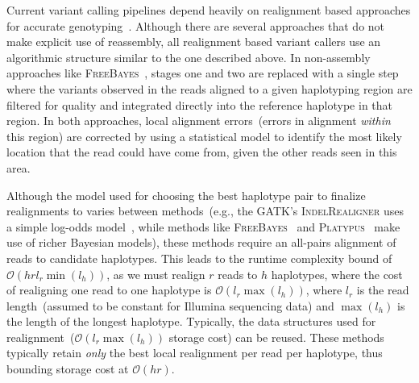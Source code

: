 \documentclass{bioinfo}
\begin{document}
Current variant calling pipelines depend heavily on realignment based approaches for accurate
genotyping~\citep{li14}. Although there are several approaches that do not make explicit use of reassembly,
all realignment based variant callers use an algorithmic structure similar to the one described
above. In non-assembly approaches like \textsc{FreeBayes}~\citep{garrison12}, stages
one and two are replaced with a single step where the variants observed in the reads aligned to a given
haplotyping region are filtered for quality and integrated directly into the reference haplotype in that region.
In both approaches, local alignment errors~(errors in alignment \emph{within} this region) are corrected
by using a statistical model to identify the most likely location that the read could have come from, given
the other reads seen in this area.

Although the model used for choosing the best haplotype pair to finalize realignments to varies between
methods~(e.g., the GATK's \textsc{IndelRealigner} uses a simple log-odds model~\citep{depristo11}, while
methods like \textsc{FreeBayes}~\citep{garrison12} and \textsc{Platypus}~\citep{rimmer14} make use of richer
Bayesian models), these methods require an all-pairs alignment of reads to candidate
haplotypes. This leads to the runtime complexity bound of $\mathcal{O}(h r l_r \min(l_h))$,
as we must realign $r$ reads to $h$ haplotypes, where the cost of realigning
one read to one haplotype is $\mathcal{O}(l_r \max(l_h))$, where $l_r$ is the read length~(assumed to be
constant for Illumina sequencing data) and $\max(l_h)$ is the length of the longest haplotype. Typically,
the data structures used for realignment~($\mathcal{O}(l_r \max(l_h))$ storage cost) can be reused.
These methods typically retain \emph{only} the best local realignment per read per haplotype, thus
bounding storage cost at $\mathcal{O}(h r)$.
\end{document}
